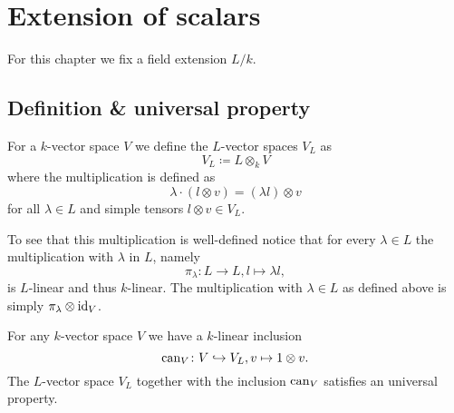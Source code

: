 \chapter{Extension of scalars}\label{app: extension of scalars}
For this chapter we fix a field extension $L/k$.




\section{Definition \& universal property}


\begin{defi}
  For a $k$-vector space $V$ we define the $L$-vector spaces $V_L$ as
  \[
    V_L \coloneqq L \otimes_k V
  \]
  where the multiplication is defined as
  \[
      \lambda \cdot (l \otimes v)
    = (\lambda l) \otimes v
  \]
  for all $\lambda \in L$ and simple tensors $l \otimes v \in V_L$.
\end{defi}

To see that this multiplication is well-defined notice that for every $\lambda \in L$ the multiplication with $\lambda$ in $L$, namely
\[
          \pi_\lambda
  \colon  L
  \to     L,
          l
  \mapsto \lambda l,
\]
is $L$-linear and thus $k$-linear.
The multiplication with $\lambda \in L$ as defined above is simply $\pi_\lambda \otimes \operatorname{id}_V$.


For any $k$-vector space $V$ we have a $k$-linear inclusion
\[
                  \operatorname{can}_V
  \colon          V
  \hookrightarrow V_L,
                  v
  \mapsto         1 \otimes v.
\]
The $L$-vector space $V_L$ together with the inclusion $\operatorname{can}_V$ satisfies an universal property.


